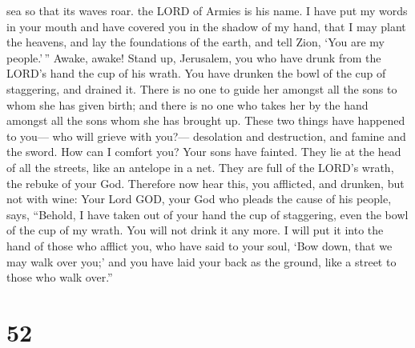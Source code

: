 sea so that its waves roar. the LORD of Armies is his name.
 I have put my words in your mouth and have covered you in
the shadow of my hand, that I may plant the heavens, and lay the
foundations of the earth, and tell Zion, `You are my people.'\,''
 Awake, awake! Stand up, Jerusalem, you who have drunk from
the LORD's hand the cup of his wrath. You have drunken the bowl of the
cup of staggering, and drained it.  There is no one to
guide her amongst all the sons to whom she has given birth; and there is
no one who takes her by the hand amongst all the sons whom she has
brought up.  These two things have happened to you--- who
will grieve with you?--- desolation and destruction, and famine and the
sword. How can I comfort you?  Your sons have fainted. They
lie at the head of all the streets, like an antelope in a net. They are
full of the LORD's wrath, the rebuke of your God. 
Therefore now hear this, you afflicted, and drunken, but not with wine:
 Your Lord GOD, your God who pleads the cause of his
people, says, ``Behold, I have taken out of your hand the cup of
staggering, even the bowl of the cup of my wrath. You will not drink it
any more.  I will put it into the hand of those who afflict
you, who have said to your soul, `Bow down, that we may walk over you;'
and you have laid your back as the ground, like a street to those who
walk over.''

\hypertarget{section-49}{%
\section{52}\label{section-49}}

